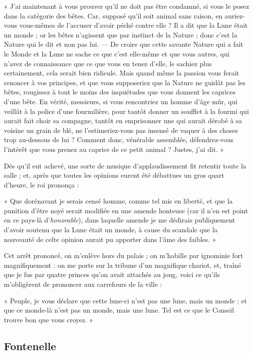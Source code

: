 \documentclass[a4paper, 11pt, oneside]{article}
\begin{document}
« J'ai maintenant à vous prouver qu'il ne doit pas être condamné, si vous le posez dans la catégorie des bêtes. Car, supposé qu'il soit animal sans raison, en auriez-vous vous-mêmes de l'accuser d'avoir péché contre elle ? Il a dit que la Lune était un monde ; or les bêtes n'agissent que par instinct de la Nature ; donc c'est la Nature qui le dit et non pas lui. --- De croire que cette savante Nature qui a fait le Monde et la Lune ne sache ce que c'est elle-même et que vous autres, qui n'avez de connaissance que ce que vous en tenez d'elle, le sachiez plus certainement, cela serait bien ridicule. Mais quand même la passion vous ferait renoncer à vos principes, et que vous supposeriez que la Nature ne guidât pas les bêtes, rougissez à tout le moins des inquiétudes que vous donnent les caprices d'une bête. En vérité, messieurs, si vous rencontriez un homme d'âge mûr, qui veillât à la police d'une fourmilière, pour tantôt donner un soufflet à la fourmi qui aurait fait choir sa compagne, tantôt en emprisonner une qui aurait dérobé à sa voisine un grain de blé, ne l'estimeriez-vous pas insensé de vaquer à des choses trop au-dessous de lui ? Comment donc, vénérable assemblée, défendrez-vous l'intérêt que vous prenez au caprice de ce petit animal ? Justes, j'ai dit. »

Dès qu'il eut achevé, une sorte de musique d'applaudissement fit retentir toute la salle ; et, après que toutes les opinions eurent été débattues un gros quart d'heure, le roi prononça :

« Que dorénavant je serais censé homme, comme tel mis en liberté, et que la punition d'être noyé serait modifiée en une amende honteuse (car il n'en est point en ce pays-là d'\emph{honorable}), dans laquelle amende je me dédirais publiquement d'avoir soutenu que la Lune était un monde, à cause du scandale que la nouveauté de celte opinion aurait pu apporter dans l'âme des faibles. »

Cet arrêt prononcé, on m'enlève hors du palais ; on m'habille par ignominie fort magnifiquement : on me porte sur la tribune d'un magnifique chariot, et, traîné que je fus par quatre princes qu'on avait attachés au joug, voici ce qu'ils m'obligèrent de prononcer aux carrefours de la ville :

« Peuple, je vous déclare que cette lune-ci n'est pas une lune, mais un monde ; et que ce monde-là n'est pas un monde, mais une lune. Tel est ce que le Conseil trouve bon que vous croyez. »
\clearpage
\subsection{Fontenelle}
\end{document}
